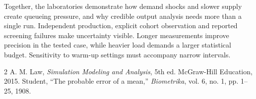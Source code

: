 \documentclass[10pt,twocolumn,letterpaper]{article}
\begin{document}
Together, the laboratories demonstrate how demand shocks and slower supply
create queueing pressure, and why credible output analysis needs more than a
single run. Independent production, explicit cohort observation and reported
screening failures make uncertainty visible. Longer measurements improve
precision in the tested case, while heavier load demands a larger statistical
budget. Sensitivity to warm-up settings must accompany narrow intervals.

\begin{thebibliography}{2}
\setlength{\itemsep}{0pt}
 A. M. Law, \textit{Simulation Modeling and Analysis}, 5th ed.
McGraw-Hill Education, 2015.
 Student, ``The probable error of a mean,'' \textit{Biometrika},
vol. 6, no. 1, pp. 1--25, 1908.
\end{thebibliography}
\end{document}
